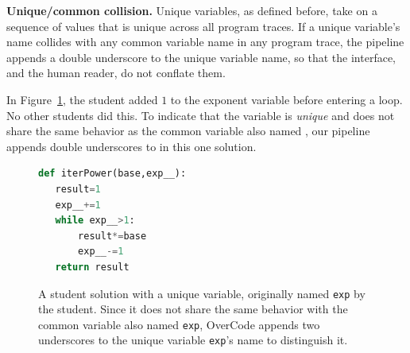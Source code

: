 {\bf Unique/common collision.} Unique variables, as defined before, take on a sequence of values that is unique across all program traces. If a unique variable's name collides with any common variable name in any program trace, the pipeline appends a double underscore to the unique variable name, so that the interface, and the human reader, do not conflate them. 

In Figure~\ref{fig:lastone}, the student added $1$ to the exponent variable before entering a  loop. No other students did this. To indicate that the  variable is {\it unique} and does not share the same behavior as the common variable also named , our pipeline appends double underscores to  in this one solution. 

\begin{figure}
\begin{minipage}{0.45\linewidth}
\begin{lstlisting}[basicstyle=\linespread{1.0}\ttfamily\footnotesize,language=python,linebackgroundcolor={\lstcolorlines[gray!20]{1,3,4,6}}]
def iterPower(base,exp__):
   result=1
   exp__+=1
   while exp__>1:
       result*=base
       exp__-=1
   return result
\end{lstlisting}
\end{minipage}
\caption{A student solution with a unique variable, originally named \texttt{exp} by the student. Since it does not share the same behavior with the common variable also named \texttt{exp}, OverCode appends two underscores to the unique variable \texttt{exp}'s name to distinguish it.}
\label{fig:lastone}
\end{figure}



